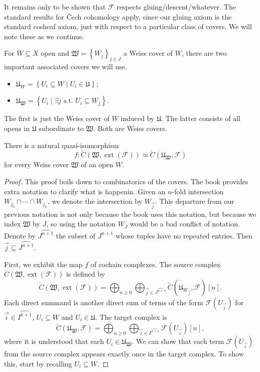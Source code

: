 It remains only to be shown that $\mathcal{F} $ respects gluing/descent/whatever. The standard results for \v{C}ech cohomology apply, since our gluing axiom is the standard cosheaf axiom, just with respect to a particular class of covers. We will note these as we continue.

For $W\subseteq X$ open and $\mathfrak{W} =\left\{ W_j \right\} _{j\in J} $ a Weiss cover of $W$, there are two important associated covers we will use.
\begin{itemize}
	\item $\mathfrak{U} _W=\left\{ U_i \subseteq W\mid U_i\in \mathfrak{U}  \right\} $;
	\item $\mathfrak{U} _{\mathfrak{W} } =\left\{ U_i\mid \exists j\text{ s.t. } U_i \subseteq W_j \right\} $.
\end{itemize}
The first is just the Weiss cover of $W$ induced by $\mathfrak{U} $. The latter consists of all opens in $\mathfrak{U} $ subordinate to $\mathfrak{W} $. Both are Weiss covers.

\begin{lemma}\label{lma:?}
	There is a natural quasi-isomorphism
	\[
		f : \check{C}(\mathfrak{W} ,\operatorname{ext} (\mathcal{F} )) \simeq \check{C}(\mathfrak{U} _{\mathfrak{W} } ,\mathcal{F} )
	\]
	for every Weiss cover $\mathfrak{W} $ of an open $W$.
\end{lemma}
\begin{proof}
	This proof boils down to combinatorics of the covers. The book provides extra notation to clarify what is happenin. Given an $n$-fold intersection $W_{j_0} \cap \cdots \cap W_{j_n} $, we denote the intersection by $W_{\vec{j} } $. This departure from our previous notation is not only because the book uses this notation, but because we index $\mathfrak{W} $ by $J$, so using the notation $W_J$ would be a bad conflict of notation. Denote by $\widehat{J^{n+1} } $ the subset of $J^{n+1} $ whose tuples have no repeated entries. Then $\vec{j} \subseteq \widehat{J^{n+1} } $.

	First, we exhibit the map $f$ of cochain complexes. The source complex $\check{C}(\mathfrak{W} ,\operatorname{ext} (\mathcal{F} ))$ is defined by
	\[
		\check{C}(\mathfrak{W} ,\operatorname{ext} (\mathcal{F} )) = \bigoplus_{n\geq 0} \bigoplus_{\vec{j} \in \widehat{J^{n+1} } } \check{C}(\mathfrak{U}_{W_{\vec{j} } } , \mathcal{F} )[n]
	.\]
	Each direct summand is another direct sum of terms of the form $\mathcal{F} (U_{\vec{i} } )$ for $\vec{i} \in \widehat{I^{k+1} } $, $U_i\subseteq W$ and $U_i\in \mathfrak{U} $. The target complex is
	\[
		\check{C}(\mathfrak{U}_{\mathfrak{W} } ,\mathcal{F} ) = \bigoplus_{n\geq 0} \bigoplus_{\vec{i} \in \widehat{I^{n+1} } } \mathcal{F} (U_{\vec{i} } )[n],
	\]
	where it is understood that each $U_i\in \mathfrak{U}_{\mathfrak{W} } $. We can show that each term $\mathcal{F} (U_{\vec{i} } )$ from the source complex appears exactly once in the target complex. To show this, start by recalling $U_i \subseteq W$. 
\end{proof}


